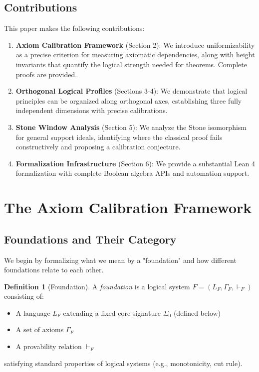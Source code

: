 \documentclass[11pt]{article}
\theoremstyle{plain}
\theoremstyle{definition}
\newtheorem{definition}[theorem]{Definition}
\newcommand{\SigmaZero}{\Sigma_{0}}
\begin{document}
\subsection{Contributions}

This paper makes the following contributions:

\begin{enumerate}
\item \textbf{Axiom Calibration Framework} (Section 2): We introduce uniformizability as a precise criterion for measuring axiomatic dependencies, along with height invariants that quantify the logical strength needed for theorems. Complete proofs are provided.

\item \textbf{Orthogonal Logical Profiles} (Sections 3-4): We demonstrate that logical principles can be organized along orthogonal axes, establishing three fully independent dimensions with precise calibrations.

\item \textbf{Stone Window Analysis} (Section 5): We analyze the Stone isomorphism for general support ideals, identifying where the classical proof fails constructively and proposing a calibration conjecture.

\item \textbf{Formalization Infrastructure} (Section 6): We provide a substantial Lean 4 formalization with complete Boolean algebra APIs and automation support.
\end{enumerate}

\section{The Axiom Calibration Framework}

\subsection{Foundations and Their Category}

We begin by formalizing what we mean by a "foundation" and how different foundations relate to each other.

\begin{definition}[Foundation]\label{def:foundation}
A \emph{foundation} is a logical system $F = (L_F, \Gamma_F, \vdash_F)$ consisting of:
\begin{itemize}
\item A language $L_F$ extending a fixed core signature $\SigmaZero$ (defined below)
\item A set of axioms $\Gamma_F$
\item A provability relation $\vdash_F$
\end{itemize}
satisfying standard properties of logical systems (e.g., monotonicity, cut rule).
\end{definition}
\end{document}
